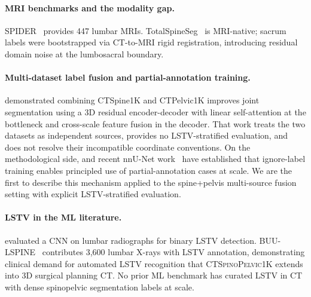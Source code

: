 \documentclass[pmlr]{jmlr}
\newcommand{\dataset}{\textsc{CTSpinoPelvic1K}}
\begin{document}
\paragraph{MRI benchmarks and the modality gap.}
SPIDER~\citep{GraafSPIDERBenchmark} provides 447 lumbar MRIs.
TotalSpineSeg~\citep{Warszawer2025TotalSpineSeg:MRI} is MRI-native;
sacrum labels were bootstrapped via CT-to-MRI rigid registration,
introducing residual domain noise at the lumbosacral boundary.

\paragraph{Multi-dataset label fusion and partial-annotation
training.}
\citet{Li2025LumbarMechanism} demonstrated combining CTSpine1K and
CTPelvic1K improves joint segmentation using a 3D residual
encoder-decoder with linear self-attention at the bottleneck and
cross-scale feature fusion in the decoder.
That work treats the two datasets as independent sources, provides
no LSTV-stratified evaluation, and does not resolve their
incompatible coordinate conventions.
On the methodological side, \citet{Wasserthal2023TotalSegmentator:Images}
and recent nnU-Net work~\citep{Isensee2024Nnu-netSegmentation} have
established that ignore-label training enables principled use of
partial-annotation cases at scale.
We are the first to describe this mechanism applied to the
spine+pelvis multi-source fusion setting with explicit
LSTV-stratified evaluation.

\paragraph{LSTV in the ML literature.}
\citet{Kwak2025AutomatedModel} evaluated a CNN on lumbar radiographs for
binary LSTV detection.
BUU-LSPINE~\citep{Klinwichit2023BUU-LSPINE:Detection} contributes 3{,}600 lumbar X-rays with
LSTV annotation, demonstrating clinical demand for automated LSTV
recognition that \dataset{} extends into 3D surgical planning CT.
No prior ML benchmark has curated LSTV in CT with dense spinopelvic
segmentation labels at scale.
\end{document}
